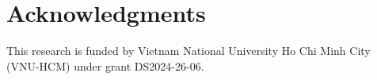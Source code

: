 \section*{Acknowledgments}

This research is funded by Vietnam National University Ho Chi Minh City (VNU-HCM) under grant DS2024-26-06.
